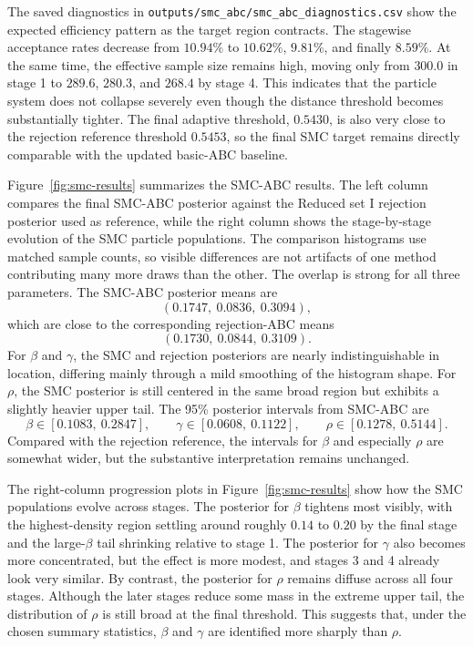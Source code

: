 \documentclass[11pt]{article}
\begin{document}
The saved diagnostics in \texttt{outputs/smc\_abc/smc\_abc\_diagnostics.csv} show the expected efficiency pattern as the target region contracts. The stagewise acceptance rates decrease from $10.94\%$ to $10.62\%$, $9.81\%$, and finally $8.59\%$. At the same time, the effective sample size remains high, moving only from $300.0$ in stage 1 to $289.6$, $280.3$, and $268.4$ by stage 4. This indicates that the particle system does not collapse severely even though the distance threshold becomes substantially tighter. The final adaptive threshold, $0.5430$, is also very close to the rejection reference threshold $0.5453$, so the final SMC target remains directly comparable with the updated basic-ABC baseline.

Figure~\ref{fig:smc-results} summarizes the SMC-ABC results. The left column compares the final SMC-ABC posterior against the Reduced set I rejection posterior used as reference, while the right column shows the stage-by-stage evolution of the SMC particle populations. The comparison histograms use matched sample counts, so visible differences are not artifacts of one method contributing many more draws than the other. The overlap is strong for all three parameters. The SMC-ABC posterior means are
\[
(0.1747,\ 0.0836,\ 0.3094),
\]
which are close to the corresponding rejection-ABC means
\[
(0.1730,\ 0.0844,\ 0.3109).
\]
For $\beta$ and $\gamma$, the SMC and rejection posteriors are nearly indistinguishable in location, differing mainly through a mild smoothing of the histogram shape. For $\rho$, the SMC posterior is still centered in the same broad region but exhibits a slightly heavier upper tail. The 95\% posterior intervals from SMC-ABC are
\[
\beta \in [0.1083,\ 0.2847], \qquad
\gamma \in [0.0608,\ 0.1122], \qquad
\rho \in [0.1278,\ 0.5144].
\]
Compared with the rejection reference, the intervals for $\beta$ and especially $\rho$ are somewhat wider, but the substantive interpretation remains unchanged.

The right-column progression plots in Figure~\ref{fig:smc-results} show how the SMC populations evolve across stages. The posterior for $\beta$ tightens most visibly, with the highest-density region settling around roughly $0.14$ to $0.20$ by the final stage and the large-$\beta$ tail shrinking relative to stage 1. The posterior for $\gamma$ also becomes more concentrated, but the effect is more modest, and stages 3 and 4 already look very similar. By contrast, the posterior for $\rho$ remains diffuse across all four stages. Although the later stages reduce some mass in the extreme upper tail, the distribution of $\rho$ is still broad at the final threshold. This suggests that, under the chosen summary statistics, $\beta$ and $\gamma$ are identified more sharply than $\rho$.
\end{document}
